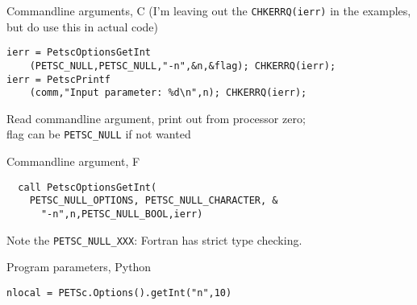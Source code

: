 \begin{c}
\begin{numberedframe}{Commandline arguments, C}
(I'm leaving out the \lstinline{CHKERRQ(ierr)} in the examples,\\
but do use this in actual code)
\begin{lstlisting}
ierr = PetscOptionsGetInt
    (PETSC_NULL,PETSC_NULL,"-n",&n,&flag); CHKERRQ(ierr);
ierr = PetscPrintf
    (comm,"Input parameter: %d\n",n); CHKERRQ(ierr);
\end{lstlisting}
Read commandline argument, print out from processor zero;\\
flag can be \lstinline{PETSC_NULL} if not wanted
\end{numberedframe}
\end{c}

\lstset{language=Fortran}
\begin{fortran}
\begin{numberedframe}{Commandline argument, F}
\begin{lstlisting}
  call PetscOptionsGetInt(
    PETSC_NULL_OPTIONS, PETSC_NULL_CHARACTER, &
      "-n",n,PETSC_NULL_BOOL,ierr)
\end{lstlisting}

Note the \lstinline{PETSC_NULL_XXX}: Fortran has strict type checking.
\end{numberedframe}
\end{fortran}

\lstset{language=C}

\lstset{language=Python}
\begin{python}
\begin{numberedframe}{Program parameters, Python}
\begin{lstlisting}
nlocal = PETSc.Options().getInt("n",10)
\end{lstlisting}
\end{numberedframe}
\end{python}
\lstset{language=C}

\endinput

\begin{numberedframe}{, C}
\begin{verbatim}
\end{verbatim}
\end{numberedframe}

\begin{numberedframe}{, F}
\begin{verbatim}
\end{verbatim}
\end{numberedframe}

